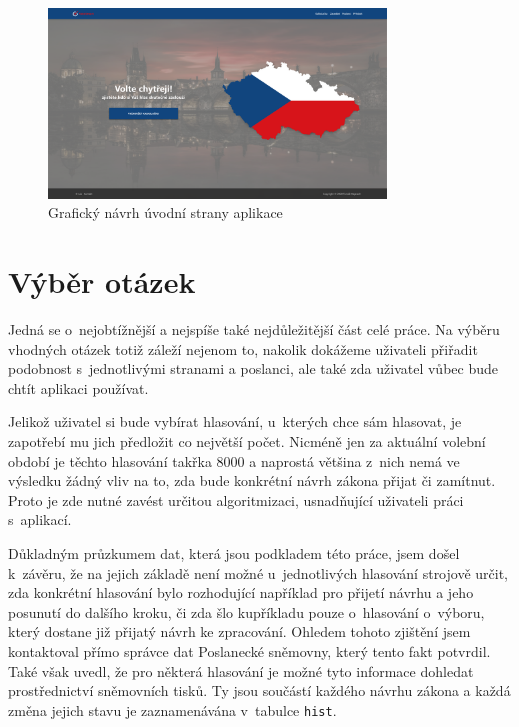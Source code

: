\begin{figure}
    \centering
    \includegraphics[width=0.8\textwidth]{obrazky-figures/Homepage.pdf}
    \caption{Grafický návrh úvodní strany aplikace}
    \label{fig:graphic-homepage}
\end{figure}


\section{Výběr otázek}
Jedná se o~nejobtížnější a nejspíše také nejdůležitější část celé práce. Na výběru vhodných otázek totiž záleží nejenom to, nakolik dokážeme uživateli přiřadit podobnost s~jednotlivými stranami a poslanci, ale také zda uživatel vůbec bude chtít aplikaci používat.\\

\par Jelikož uživatel si bude vybírat hlasování, u~kterých chce sám hlasovat, je zapotřebí mu jich předložit co největší počet. Nicméně jen za aktuální volební období je těchto hlasování takřka 8000 a naprostá většina z~nich nemá ve výsledku žádný vliv na to, zda bude konkrétní návrh zákona přijat či zamítnut. Proto je zde nutné zavést určitou algoritmizaci, usnadňující uživateli práci s~aplikací. 

\par Důkladným průzkumem dat, která jsou podkladem této práce, jsem došel k~závěru, že na jejich základě není možné u~jednotlivých hlasování strojově určit, zda konkrétní hlasování bylo rozhodující například pro přijetí návrhu a jeho posunutí do dalšího kroku, či zda šlo kupříkladu pouze o~hlasování o~výboru, který dostane již přijatý návrh ke zpracování. Ohledem tohoto zjištění jsem kontaktoval přímo správce dat Poslanecké sněmovny, který tento fakt potvrdil. Také však uvedl, že pro některá hlasování je možné tyto informace dohledat prostřednictví sněmovních tisků. Ty jsou součástí každého návrhu zákona a každá změna jejich stavu je zaznamenávána v~tabulce \texttt{hist}.\\

